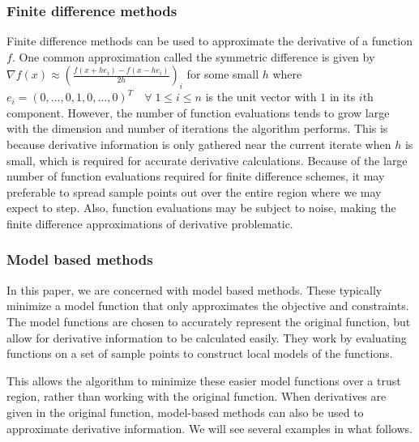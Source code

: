 \documentclass{article}
\begin{document}

\subsubsection{Finite difference methods}

Finite difference methods can be used to approximate the derivative of a function $f$.
One common approximation called the symmetric difference is given by $\nabla f(x) \approx (\frac{f(x+he_i) - f(x-he_i)}{2h})_i$ for some small $h$ where $e_i = (0,\ldots, 0, 1, 0, \ldots, 0)^T \quad \forall \; 1 \le i \le n$ is the unit vector with $1$ in its $i$th component.
However, the number of function evaluations tends to grow large with the dimension and number of iterations the algorithm performs.
This is because derivative information is only gathered near the current iterate when $h$ is small, which is required for accurate derivative calculations.
Because of the large number of function evaluations required for finite difference schemes, it may preferable to spread sample points out over the entire region where we may expect to step.
Also, function evaluations may be subject to noise, making the finite difference approximations of derivative problematic.

\subsubsection{Model based methods}

In this paper, we are concerned with model based methods.
These typically minimize a model function that only approximates the objective and constraints.
The model functions are chosen to accurately represent the original function, but allow for derivative information to be calculated easily.
They work by evaluating functions on a set of sample points to construct local models of the functions.

This allows the algorithm to minimize these easier model functions over a trust region, rather than working with the original function.
When derivatives are given in the original function, model-based methods can also be used to approximate derivative information.
We will see several examples in what follows.


\end{document}
